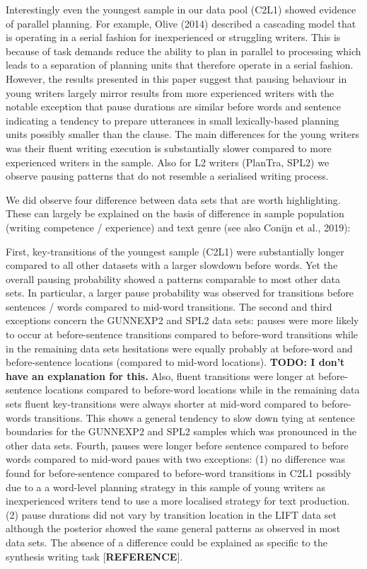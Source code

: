 \documentclass[
  english,
  man,floatsintext]{apa7}
\begin{document}
Interestingly even the youngest sample in our data pool (C2L1) showed evidence of parallel planning. For example, Olive (2014) described a cascading model that is operating in a serial fashion for inexperienced or struggling writers. This is because of task demands reduce the ability to plan in parallel to processing which leads to a separation of planning units that therefore operate in a serial fashion. However, the results presented in this paper suggest that pausing behaviour in young writers largely mirror results from more experienced writers with the notable exception that pause durations are similar before words and sentence indicating a tendency to prepare utterances in small lexically-based planning units possibly smaller than the clause. The main differences for the young writers was their fluent writing execution is substantially slower compared to more experienced writers in the sample. Also for L2 writers (PlanTra, SPL2) we observe pausing patterns that do not resemble a serialised writing process.

We did observe four difference between data sets that are worth highlighting. These can largely be explained on the basis of difference in sample population (writing competence / experience) and text genre (see also Conijn et al., 2019):

First, key-transitions of the youngest sample (C2L1) were substantially longer compared to all other datasets with a larger slowdown before words. Yet the overall pausing probability showed a patterns comparable to most other data sets. In particular, a larger pause probability was observed for transitions before sentences / words compared to mid-word transitions. The second and third exceptions concern the GUNNEXP2 and SPL2 data sets: pauses were more likely to occur at before-sentence transitions compared to before-word transitions while in the remaining data sets hesitations were equally probably at before-word and before-sentence locations (compared to mid-word locations). \textbf{TODO: I don't have an explanation for this.} Also, fluent transitions were longer at before-sentence locations compared to before-word locations while in the remaining data sets fluent key-transitions were always shorter at mid-word compared to before-words transitions. This shows a general tendency to slow down tying at sentence boundaries for the GUNNEXP2 and SPL2 samples which was pronounced in the other data sets. Fourth, pauses were longer before sentence compared to before words compared to mid-word paues with two exceptions: (1) no difference was found for before-sentence compared to before-word transitions in C2L1 possibly due to a a word-level planning strategy in this sample of young writers as inexperienced writers tend to use a more localised strategy for text production. (2) pause durations did not vary by transition location in the LIFT data set although the posterior showed the same general patterns as observed in most data sets. The absence of a difference could be explained as specific to the synthesis writing task {[}\textbf{REFERENCE}{]}.
\end{document}
